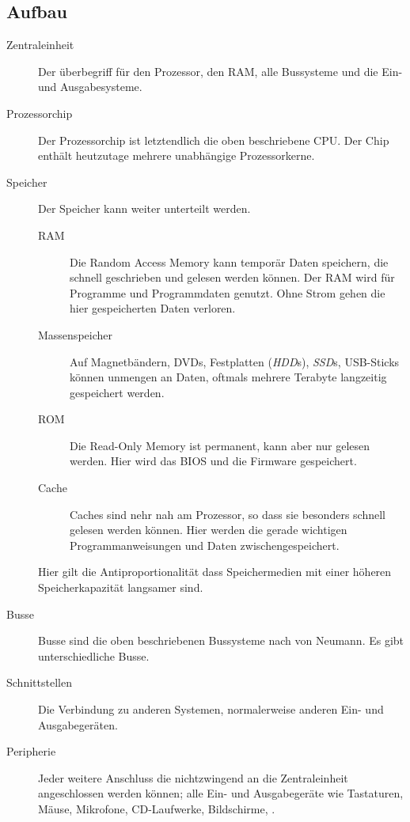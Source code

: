 \documentclass{article}
\begin{document}
\subsection{Aufbau}
\begin{description}
 \item[Zentraleinheit] Der überbegriff für den Prozessor, den RAM, alle Bussysteme und die Ein- und Ausgabesysteme.
 \item[Prozessorchip] Der Prozessorchip ist letztendlich die oben beschriebene CPU. Der Chip enthält heutzutage mehrere unabhängige Prozessorkerne.
 \item[Speicher] Der Speicher kann weiter unterteilt werden.
 \begin{description}
  \item[RAM] Die Random Access Memory kann temporär Daten speichern, die schnell geschrieben und gelesen werden können. Der RAM wird \idr für Programme und Programmdaten genutzt. Ohne Strom gehen die hier gespeicherten Daten verloren.
  \item[Massenspeicher] Auf Magnetbändern, DVDs, Festplatten (\emph{HDD}s), \emph{SSD}s, USB-Sticks \etc können unmengen an Daten, oftmals mehrere Terabyte langzeitig gespeichert werden.
  \item[ROM] Die Read-Only Memory ist permanent, kann aber nur gelesen werden. Hier wird das BIOS und die Firmware gespeichert.
  \item[Cache] Caches sind nehr nah am Prozessor, so dass sie besonders schnell gelesen werden können. Hier werden die gerade wichtigen Programmanweisungen und Daten zwischengespeichert. 
 \end{description}
 Hier gilt die Antiproportionalität dass Speichermedien mit einer höheren Speicherkapazität langsamer sind.
 \item[Busse] Busse sind die oben beschriebenen Bussysteme nach von Neumann. Es gibt unterschiedliche Busse.
 \item[Schnittstellen] Die Verbindung zu anderen Systemen, normalerweise anderen Ein- und Ausgabegeräten.
 \item[Peripherie] Jeder weitere Anschluss die nichtzwingend an die Zentraleinheit angeschlossen werden können; alle Ein- und Ausgabegeräte wie Tastaturen, Mäuse, Mikrofone, CD-Laufwerke, Bildschirme, \etc.
\end{description}

\end{document}
